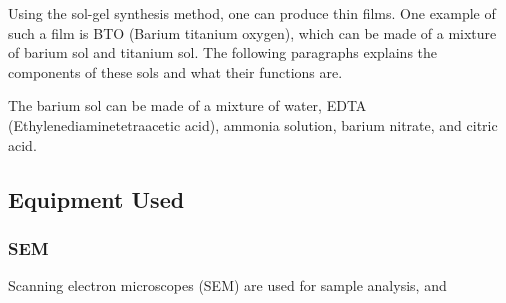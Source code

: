\noindent Using the sol-gel synthesis method, one can produce thin films. One example of such a film is BTO (Barium titanium oxygen), which can be made of a mixture of barium sol and titanium sol. The following paragraphs explains the components of these sols and what their functions are.

The barium sol can be made of a mixture of water, EDTA (Ethylenediaminetetraacetic acid), ammonia solution, barium nitrate, and citric acid. 

\subsection{Equipment Used}

\subsubsection{SEM}

Scanning electron microscopes (SEM) are used for sample analysis, and